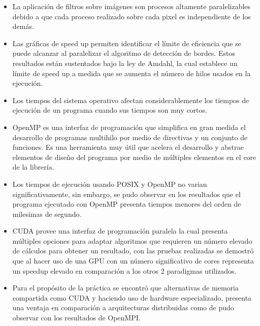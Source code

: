 \begin{itemize}
    \item La aplicación de filtros sobre imágenes son procesos altamente paralelizables debido a que cada proceso realizado sobre cada pixel es independiente de los demás.
    \item Las gráficas de speed up permiten identificar el límite de eficiencia que se puede alcanzar al paralelizar el algoritmo de detección de bordes. Estos resultados están sustentados bajo la ley de Amdahl, la cual establece un límite de speed up a medida que se aumenta el número de hilos usados en la ejecución.
    \item Los tiempos del sistema operativo afectan considerablemente los tiempos de ejecución de un programa cuando sus tiempos son muy cortos.
    \item OpenMP es una interfaz de programación que simplifica en gran medida el desarrollo de programas multihilo por medio de directivas y un conjunto de funciones. Es una herramienta muy útil que acelera el desarrollo y abstrae elementos de diseño del programa por medio de múltiples elementos en el core de la librería.
    \item Los tiempos de ejecución usando POSIX y OpenMP no varian significativamente, sin embargo, se pudo observar en los resultados que el programa ejecutado con OpenMP presenta tiempos menores del orden de milesimas de segundo.
    \item CUDA provee una interfaz de programación paralela la cual presenta múltiples opciones para adaptar algoritmos que requieren un número elevado de cálculos para obtener un resultado, con las pruebas realizadas se demostró que al hacer uso de una GPU con un número significativo de cores representa un speedup elevado en comparación a los otros 2 paradigmas utilizados.
    \item Para el propósito de la práctica se encontró que alternativas de memoria compartida como CUDA y haciendo uso de hardware especializado, presenta una ventaja en comparación a arquitecturas distribuidas como de pudo observar con los resultados de OpenMPI.
\end{itemize}


